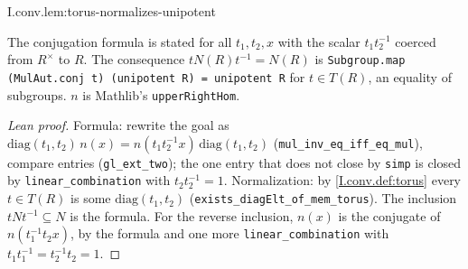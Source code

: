 \begin{lemma}[$T$ normalizes $N$]
\end{lemma}
\begin{tfformal}{I.conv.lem:torus-normalizes-unipotent}
\begin{tffidelity}
The conjugation formula is stated for all $t_1,t_2,x$ with the scalar $t_1t_2^{-1}$ coerced from $R^\times$ to $R$. The consequence $tN(R)t^{-1}=N(R)$ is \texttt{Subgroup.map (MulAut.conj t) (unipotent R) = unipotent R} for $t\in T(R)$, an equality of subgroups. $n$ is Mathlib's \texttt{upperRightHom}.
\end{tffidelity}
\end{tfformal}
\begin{proof}[Lean proof]
Formula: rewrite the goal as $\mathrm{diag}(t_1,t_2)\,n(x)=n(t_1t_2^{-1}x)\,\mathrm{diag}(t_1,t_2)$ (\texttt{mul\_inv\_eq\_iff\_eq\_mul}), compare entries (\texttt{gl\_ext\_two}); the one entry that does not close by \texttt{simp} is closed by \texttt{linear\_combination} with $t_2t_2^{-1}=1$. Normalization: by \cref{I.conv.def:torus} every $t\in T(R)$ is some $\mathrm{diag}(t_1,t_2)$ (\texttt{exists\_diagElt\_of\_mem\_torus}). The inclusion $tN t^{-1}\subseteq N$ is the formula. For the reverse inclusion, $n(x)$ is the conjugate of $n(t_1^{-1}t_2x)$, by the formula and one more \texttt{linear\_combination} with $t_1t_1^{-1}=t_2^{-1}t_2=1$.
\end{proof}

